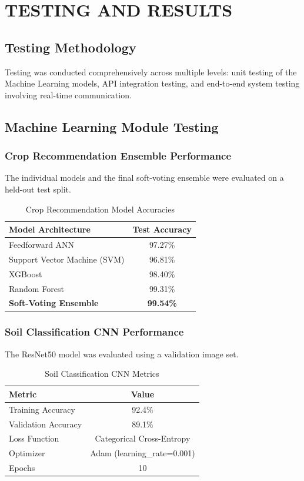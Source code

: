 \documentclass[12pt,a4paper]{report}
\begin{document}
\chapter{TESTING AND RESULTS}

\section{Testing Methodology}
Testing was conducted comprehensively across multiple levels: unit testing of the Machine Learning models, API integration testing, and end-to-end system testing involving real-time communication.

\section{Machine Learning Module Testing}
\subsection{Crop Recommendation Ensemble Performance}
The individual models and the final soft-voting ensemble were evaluated on a held-out test split.

\begin{table}[H]
\caption{Crop Recommendation Model Accuracies}
\centering
\begin{tabular}{|l|c|}
\hline
\textbf{Model Architecture} & \textbf{Test Accuracy} \\ \hline
Feedforward ANN & 97.27\% \\ \hline
Support Vector Machine (SVM) & 96.81\% \\ \hline
XGBoost & 98.40\% \\ \hline
Random Forest & 99.31\% \\ \hline
\textbf{Soft-Voting Ensemble} & \textbf{99.54\%} \\ \hline
\end{tabular}
\end{table}

\subsection{Soil Classification CNN Performance}
The ResNet50 model was evaluated using a validation image set.

\begin{table}[H]
\caption{Soil Classification CNN Metrics}
\centering
\begin{tabular}{|l|c|}
\hline
\textbf{Metric} & \textbf{Value} \\ \hline
Training Accuracy & 92.4\% \\ \hline
Validation Accuracy & 89.1\% \\ \hline
Loss Function & Categorical Cross-Entropy \\ \hline
Optimizer & Adam (learning\_rate=0.001) \\ \hline
Epochs & 10 \\ \hline
\end{tabular}
\end{table}
\end{document}
